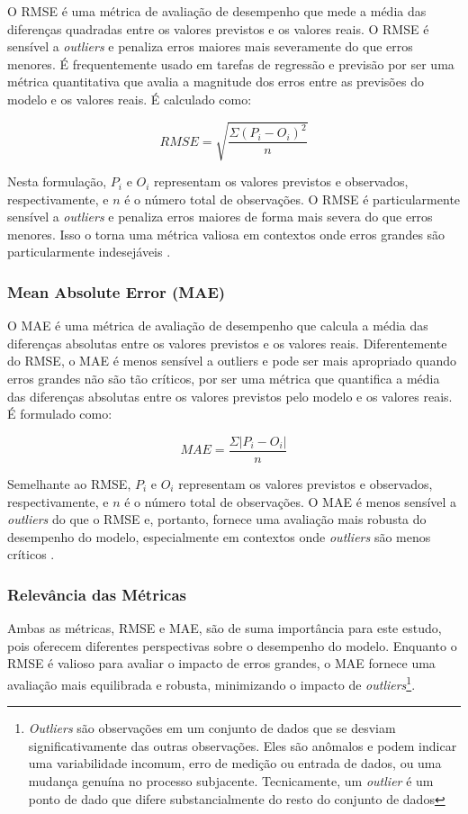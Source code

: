 O RMSE é uma métrica de avaliação de desempenho que mede a média das diferenças quadradas entre os valores previstos e os valores reais. O RMSE é sensível a \textit{outliers} e penaliza erros maiores mais severamente do que erros menores. É frequentemente usado em tarefas de regressão e previsão por ser uma métrica quantitativa que avalia a magnitude dos erros entre as previsões do modelo e os valores reais. É calculado como:

\[
RMSE = \sqrt{\frac{\Sigma (P_i - O_i)^2}{n}}
\]

Nesta formulação, \(P_i\) e \(O_i\) representam os valores previstos e observados, respectivamente, e \(n\) é o número total de observações. O RMSE é particularmente sensível a \textit{outliers} e penaliza erros maiores de forma mais severa do que erros menores. Isso o torna uma métrica valiosa em contextos onde erros grandes são particularmente indesejáveis \cite{willmott2005advantages}.

\subsubsection{Mean Absolute Error (MAE)}

O MAE é uma métrica de avaliação de desempenho que calcula a média das diferenças absolutas entre os valores previstos e os valores reais. Diferentemente do RMSE, o MAE é menos sensível a outliers e pode ser mais apropriado quando erros grandes não são tão críticos, por ser uma métrica que quantifica a média das diferenças absolutas entre os valores previstos pelo modelo e os valores reais. É formulado como:

\[
MAE = \frac{\Sigma | P_i - O_i|}{n}
\]

Semelhante ao RMSE, \(P_i\) e \(O_i\) representam os valores previstos e observados, respectivamente, e \(n\) é o número total de observações. O MAE é menos sensível a \textit{outliers} do que o RMSE e, portanto, fornece uma avaliação mais robusta do desempenho do modelo, especialmente em contextos onde \textit{outliers} são menos críticos \cite{willmott2005advantages}.

\subsubsection{Relevância das Métricas}

Ambas as métricas, RMSE e MAE, são de suma importância para este estudo, pois oferecem diferentes perspectivas sobre o desempenho do modelo. Enquanto o RMSE é valioso para avaliar o impacto de erros grandes, o MAE fornece uma avaliação mais equilibrada e robusta, minimizando o impacto de \textit{outliers}\footnote{\textit{Outliers} são observações em um conjunto de dados que se desviam significativamente das outras observações. Eles são anômalos e podem indicar uma variabilidade incomum, erro de medição ou entrada de dados, ou uma mudança genuína no processo subjacente. Tecnicamente, um \textit{outlier} é um ponto de dado que difere substancialmente do resto do conjunto de dados}.
